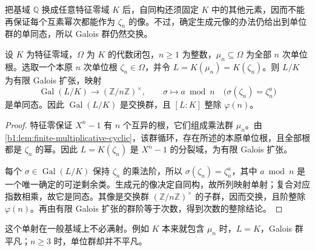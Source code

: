 \ProseParagraphBreak
把基域 \(\mathbb Q\) 换成任意特征零域 \(K\) 后，自同构还须固定 \(K\) 中的其他元素，因而不能再保证每个互素幂次都能作为 \(\zeta_n\) 的像。不过，确定生成元像的办法仍给出到单位群的单同态，所以 Galois 群仍然交换。

\begin{proposition}\label{b1:prop:cyclotomic-general-base}
	设 \(K\) 为特征零域，\(\Omega\) 为 \(K\) 的代数闭包，\(n\geq1\) 为整数，\(\mu_n\subseteq\Omega\) 为全部 \(n\) 次单位根。选取一个本原 \(n\) 次单位根 \(\zeta_n\in\Omega\)，并令 \(L=K(\mu_n)=K(\zeta_n)\)。则 \(L/K\) 为有限 Galois 扩张，映射
	\[
		\operatorname{Gal}(L/K)\longrightarrow(\mathbb Z/n\mathbb Z)^\times, \qquad\sigma\longmapsto a\bmod n\quad \bigl(\sigma(\zeta_n)=\zeta_n^a\bigr)
	\]
	是单同态。因此 \(\operatorname{Gal}(L/K)\) 是交换群，且 \([L:K]\) 整除 \(\varphi(n)\)。
\end{proposition}
\begin{proof}
	特征零保证 \(X^n-1\) 有 \(n\) 个互异的根，它们组成乘法群 \(\mu_n\)。由\cref{b1:lem:finite-multiplicative-cyclic}，该群循环，存在所述的本原单位根，且全部根都是 \(\zeta_n\) 的幂。因此 \(L=K(\zeta_n)\) 是 \(X^n-1\) 的分裂域，为有限 Galois 扩张。

	每个 \(\sigma\in\operatorname{Gal}(L/K)\) 保持 \(\zeta_n\) 的乘法阶，所以 \(\sigma(\zeta_n)=\zeta_n^a\)，其中 \(a\bmod n\) 是一个唯一确定的可逆剩余类。生成元的像决定自同构，故所列映射单射；复合对应指数相乘，故它是同态。其像是交换群 \((\mathbb Z/n\mathbb Z)^\times\) 的子群，因而交换，且阶整除 \(\varphi(n)\)。再由有限 Galois 扩张的群阶等于次数，得到次数的整除结论。
\end{proof}

这个单射在一般基域上不必满射。例如 \(K\) 本来就包含 \(\mu_n\) 时，\(L=K\)，Galois 群平凡；\(n\geq3\) 时，单位群却并不平凡。

